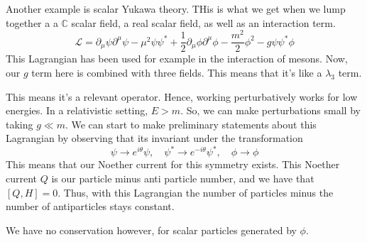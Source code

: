 Another example is scalar Yukawa theory. 
THis is what we get when we lump together a 
a $ \mathbb{ C} $ scalar field, a real scalar field, as well as an interaction term. 
\[
\mathcal{ L } = \partial _\mu\psi \partial ^ \mu \psi - \mu ^ 2 \psi \psi ^ * + \frac{1}{2 } \partial _\mu \phi \partial  ^ \mu \phi - \frac{m^2}{ 2 } \phi ^ 2 - g \psi \psi ^ * \phi  
\] This Lagrangian has been used for example in 
the interaction of mesons.
Now, our $ g $ term here is combined with three fields. 
This means that it's like a $ \lambda _ 3  $ term. 

This means it's a relevant operator. Hence, working perturbatively works 
for low energies. In a relativistic setting, 
$ E > m$. So, we can make perturbations small by taking 
$ g \ll m $. 
We can start to make preliminary statements about this Lagrangian by 
observing that  its invariant under the transformation 
\[
\psi \to e^{ i \theta } \psi, \quad \psi^ * \to e^{ - i \theta }\psi^ *  , \quad \phi \to \phi 
\] This means that our Noether current 
for this symmetry exists. This Noether current $ Q $ is our
particle minus anti particle number, and we have that $ [ Q, H ] = 0 $. 
Thus, with this Lagrangian the number of particles minus the number of antiparticles
stays constant. 

We have no conservation however, for scalar particles generated by  $ \phi$. 

\pagebreak 

